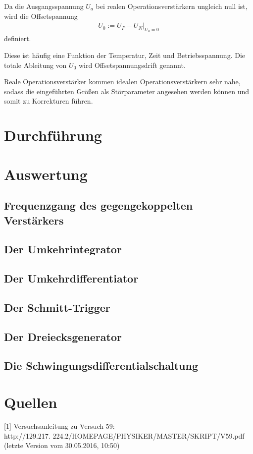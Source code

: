 \documentclass[]{scrartcl}
\begin{document}
Da die Ausgangsspannung $U_{a}$ bei realen Operationsverstärkern ungleich null ist, wird die Offsetspannung
\begin{align}
 U_0:=\left. U_{P}-U_{N} \right|_{U_{a}=0}
\end{align}
definiert.

Diese ist häufig eine Funktion der Temperatur, Zeit und Betriebsspannung. Die totale Ableitung von $U_{0}$ wird Offsetspannungsdrift genannt.

Reale Operationsverstärker kommen idealen Operationsverstärkern sehr nahe, sodass die eingeführten Größen als Störparameter angesehen werden können und somit zu Korrekturen führen.
\section{Durchführung}

\section{Auswertung}

\subsection{Frequenzgang des gegengekoppelten Verstärkers}

\subsection{Der Umkehrintegrator}

\subsection{Der Umkehrdifferentiator}

\subsection{Der Schmitt-Trigger}

\subsection{Der Dreiecksgenerator}

\subsection{Die Schwingungsdifferentialschaltung}

\section{Quellen}
{[1]} Versuchsanleitung zu Versuch 59: \\
http://129.217.
224.2/HOMEPAGE/PHYSIKER/MASTER/SKRIPT/V59.pdf (letzte Version vom 30.05.2016, 10:50)\\
\end{document}
